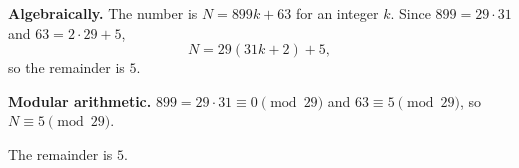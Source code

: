 \textbf{Algebraically.} The number is $N=899k+63$ for an integer $k$. Since $899=29\cdot31$ and $63=2\cdot29+5$,
\[N=29(31k+2)+5,\]
so the remainder is $5$.

\textbf{Modular arithmetic.} $899=29\cdot31\equiv0\pmod{29}$ and $63\equiv5\pmod{29}$, so $N\equiv5\pmod{29}$.

The remainder is $\boxed{5}$.
